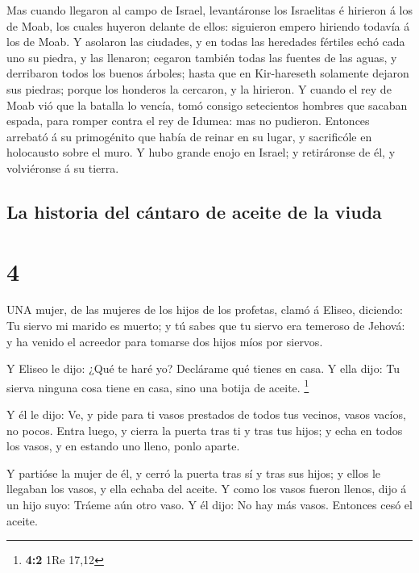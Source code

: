  Mas cuando llegaron al campo de Israel, levantáronse los
Israelitas é hirieron á los de Moab, los cuales huyeron delante de
ellos: siguieron empero hiriendo todavía á los de Moab.  Y
asolaron las ciudades, y en todas las heredades fértiles echó cada uno
su piedra, y las llenaron; cegaron también todas las fuentes de las
aguas, y derribaron todos los buenos árboles; hasta que en Kir-hareseth
solamente dejaron sus piedras; porque los honderos la cercaron, y la
hirieron.  Y cuando el rey de Moab vió que la batalla lo
vencía, tomó consigo setecientos hombres que sacaban espada, para romper
contra el rey de Idumea: mas no pudieron.  Entonces
arrebató á su primogénito que había de reinar en su lugar, y sacrificóle
en holocausto sobre el muro. Y hubo grande enojo en Israel; y
retiráronse de él, y volviéronse á su tierra.

\hypertarget{la-historia-del-cuxe1ntaro-de-aceite-de-la-viuda}{%
\subsection{La historia del cántaro de aceite de la
viuda}\label{la-historia-del-cuxe1ntaro-de-aceite-de-la-viuda}}

\hypertarget{section-3}{%
\section{4}\label{section-3}}

 UNA mujer, de las mujeres de los hijos de los profetas,
clamó á Eliseo, diciendo: Tu siervo mi marido es muerto; y tú sabes que
tu siervo era temeroso de Jehová: y ha venido el acreedor para tomarse
dos hijos míos por siervos.

 Y Eliseo le dijo: ¿Qué te haré yo? Declárame qué tienes en
casa. Y ella dijo: Tu sierva ninguna cosa tiene en casa, sino una botija
de aceite. \footnote{\textbf{4:2} 1Re 17,12}

 Y él le dijo: Ve, y pide para ti vasos prestados de todos
tus vecinos, vasos vacíos, no pocos.  Entra luego, y cierra
la puerta tras ti y tras tus hijos; y echa en todos los vasos, y en
estando uno lleno, ponlo aparte.

 Y partióse la mujer de él, y cerró la puerta tras sí y tras
sus hijos; y ellos le llegaban los vasos, y ella echaba del aceite.
 Y como los vasos fueron llenos, dijo á un hijo suyo: Tráeme
aún otro vaso. Y él dijo: No hay más vasos. Entonces cesó el aceite.

